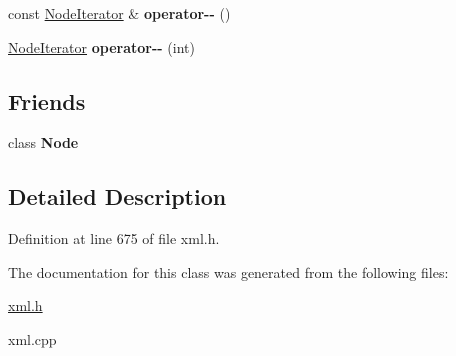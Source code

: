 \begin{DoxyCompactItemize}
\item 
\hypertarget{classphys_1_1xml_1_1NodeIterator_a9d0ace0a01c3ea0a0ff2ed389b4a5141}{
const \hyperlink{classphys_1_1xml_1_1NodeIterator}{NodeIterator} \& {\bfseries operator-\/-\/} ()}
\label{da/d4f/classphys_1_1xml_1_1NodeIterator_a9d0ace0a01c3ea0a0ff2ed389b4a5141}

\item 
\hypertarget{classphys_1_1xml_1_1NodeIterator_a4775254b1fbfc2e10a6024241be55f6a}{
\hyperlink{classphys_1_1xml_1_1NodeIterator}{NodeIterator} {\bfseries operator-\/-\/} (int)}
\label{da/d4f/classphys_1_1xml_1_1NodeIterator_a4775254b1fbfc2e10a6024241be55f6a}

\end{DoxyCompactItemize}
\subsection*{Friends}
\begin{DoxyCompactItemize}
\item 
\hypertarget{classphys_1_1xml_1_1NodeIterator_a6db9d28bd448a131448276ee03de1e6d}{
class {\bfseries Node}}
\label{da/d4f/classphys_1_1xml_1_1NodeIterator_a6db9d28bd448a131448276ee03de1e6d}

\end{DoxyCompactItemize}


\subsection{Detailed Description}


Definition at line 675 of file xml.h.



The documentation for this class was generated from the following files:\begin{DoxyCompactItemize}
\item 
\hyperlink{xml_8h}{xml.h}\item 
xml.cpp\end{DoxyCompactItemize}
